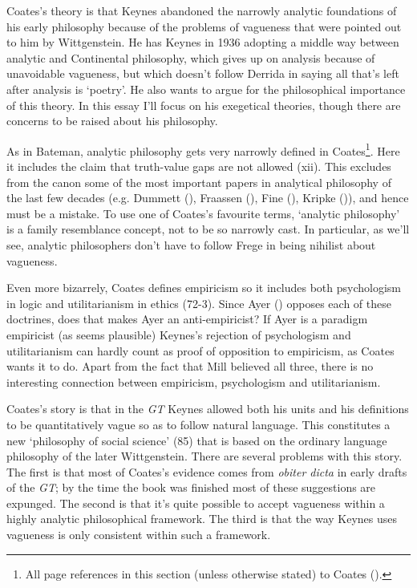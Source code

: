 \documentclass[
  10pt,
  letterpaper,
  DIV=11,
  numbers=noendperiod,
  twoside]{scrartcl}
\begin{document}
Coates's theory is that Keynes abandoned the narrowly analytic
foundations of his early philosophy because of the problems of vagueness
that were pointed out to him by Wittgenstein. He has Keynes in 1936
adopting a middle way between analytic and Continental philosophy, which
gives up on analysis because of unavoidable vagueness, but which doesn't
follow Derrida in saying all that's left after analysis is `poetry'. He
also wants to argue for the philosophical importance of this theory. In
this essay I'll focus on his exegetical theories, though there are
concerns to be raised about his philosophy.

As in Bateman, analytic philosophy gets very narrowly defined in
Coates\footnote{All page references in this section (unless otherwise
  stated) to Coates ().}. Here it
includes the claim that truth-value gaps are not allowed (xii). This
excludes from the canon some of the most important papers in analytical
philosophy of the last few decades (e.g. Dummett
(), Fraassen
(), Fine
(), Kripke
()), and hence must be a mistake. To use
one of Coates's favourite terms, `analytic philosophy' is a family
resemblance concept, not to be so narrowly cast. In particular, as we'll
see, analytic philosophers don't have to follow Frege in being nihilist
about vagueness.

Even more bizarrely, Coates defines empiricism so it includes both
psychologism in logic and utilitarianism in ethics (72-3). Since Ayer
() opposes each of these doctrines, does
that makes Ayer an anti-empiricist? If Ayer is a paradigm empiricist (as
seems plausible) Keynes's rejection of psychologism and utilitarianism
can hardly count as proof of opposition to empiricism, as Coates wants
it to do. Apart from the fact that Mill believed all three, there is no
interesting connection between empiricism, psychologism and
utilitarianism.

Coates's story is that in the \emph{GT} Keynes allowed both his units
and his definitions to be quantitatively vague so as to follow natural
language. This constitutes a new `philosophy of social science' (85)
that is based on the ordinary language philosophy of the later
Wittgenstein. There are several problems with this story. The first is
that most of Coates's evidence comes from \emph{obiter dicta} in early
drafts of the \emph{GT}; by the time the book was finished most of these
suggestions are expunged. The second is that it's quite possible to
accept vagueness within a highly analytic philosophical framework. The
third is that the way Keynes uses vagueness is only consistent within
such a framework.
\end{document}
